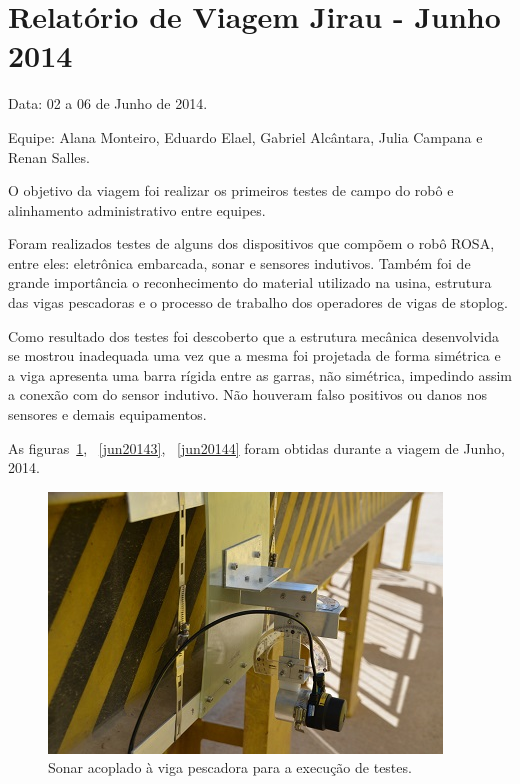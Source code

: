 \section{Relatório de Viagem Jirau - Junho 2014}
Data: 02 a 06 de Junho de 2014.

Equipe: Alana Monteiro, Eduardo Elael, Gabriel Alcântara, Julia Campana e Renan
Salles.

O objetivo da viagem foi realizar os primeiros testes de campo do robô e
alinhamento administrativo entre equipes.

Foram realizados testes de alguns dos dispositivos que compõem o
robô ROSA, entre eles: eletrônica embarcada, sonar e sensores indutivos. Também
foi de grande importância o reconhecimento do material utilizado na usina,
estrutura das vigas pescadoras e o processo de trabalho dos operadores de vigas
de stoplog.

Como resultado dos testes foi descoberto que a estrutura mecânica desenvolvida
se mostrou inadequada uma vez que a mesma foi projetada de forma simétrica e a
viga apresenta uma barra rígida entre as garras, não simétrica, impedindo assim
a conexão com do sensor indutivo. Não houveram falso positivos ou danos nos
sensores e demais equipamentos.

As figuras~\ref{jun20141}, ~\ref{jun20143}, ~\ref{jun20144}
foram obtidas durante a viagem de Junho, 2014.

\begin{figure}[h!]
\centering
  \includegraphics[width=1\linewidth]{Fotos/JirauJunho2014/1.JPG}
  \caption{Sonar acoplado à viga pescadora para a execução de testes.}
  \label{jun20141}
\end{figure}

